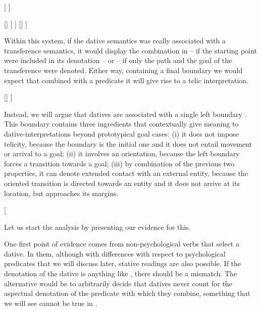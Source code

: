 \documentclass[output=paper,colorlinks,citecolor=brown,nonflat]{langsci/langscibook}
\begin{document}
\ea%
    \label{ex:fabregas:14}
    \ea\label{ex:fabregas:14a}{}
    [
    \ex\label{ex:fabregas:14b}{}
    ]
    \z
\z

\ea%
    \label{ex:fabregas:15}
    \ea\label{ex:fabregas:15a}{}
    [{\midline}]
    \ex\label{ex:fabregas:15b}{}
    [{\midline}
    \ex\label{ex:fabregas:15c}{}
    ]{\midline}
    \ex\label{ex:fabregas:15d}{}
    []
    \ex\label{ex:fabregas:15e}{}
    ]
    \z
\z

Within this system, if the dative semantics was really associated with a transference semantics, it would display the combination in  – if the starting point were included in its denotation – or  – if only the path and the goal of the transference were denoted. Either way, containing a final boundary we would expect that combined with a predicate it will give rise to a telic interpretation.

\ea%
    \label{ex:fabregas:16}
    \ea\label{ex:fabregas:16a}{}
    [{\midline}]
    \ex\label{ex:fabregas:16b}{}
    {\midline}]
    \z
\z

Instead, we will argue that datives are associated with a single left boundary . This boundary contains three ingredients that contextually give meaning to dative-interpretations beyond prototypical goal cases: (i) it does not impose telicity, because the boundary is the initial one and it does not entail movement or arrival to a goal; (ii) it involves an orientation, because the left boundary forces a transition towards a goal; (iii) by combination of the previous two properties, it can denote extended contact with an external entity, because the oriented transition is directed towards an entity and it does not arrive at its location, but approaches its margins.

\ea%
    \label{ex:fabregas:17}{}
    [
    \z

Let us start the analysis by presenting our evidence for this.


One first point of evidence comes from non-psychological verbs that select a dative. In them, although with differences with respect to psychological predicates that we will discuss later, stative readings are also possible. If the denotation of the dative is anything like , there should be a mismatch. The alternative would be to arbitrarily decide that datives never count for the aspectual denotation of the predicate with which they combine, something that we will see cannot be true in .
\end{document}
